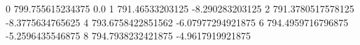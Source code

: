 0 799.755615234375 0.0
1 791.46533203125 -8.290283203125
2 791.3780517578125 -8.3775634765625
4 793.6758422851562 -6.07977294921875
6 794.4959716796875 -5.2596435546875
8 794.7938232421875 -4.9617919921875
